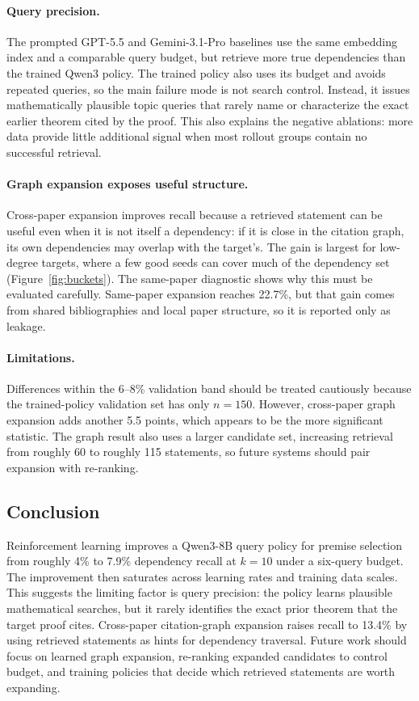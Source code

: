 \paragraph{Query precision.} The prompted GPT-5.5 and Gemini-3.1-Pro baselines use the same embedding index and a comparable query budget, but retrieve more true dependencies than the trained Qwen3 policy. The trained policy also uses its budget and avoids repeated queries, so the main failure mode is not search control. Instead, it issues mathematically plausible topic queries that rarely name or characterize the exact earlier theorem cited by the proof. This also explains the negative ablations: more data provide little additional signal when most rollout groups contain no successful retrieval.

\paragraph{Graph expansion exposes useful structure.} Cross-paper expansion improves recall because a retrieved statement can be useful even when it is not itself a dependency: if it is close in the citation graph, its own dependencies may overlap with the target's. The gain is largest for low-degree targets, where a few good seeds can cover much of the dependency set (Figure~\ref{fig:buckets}). The same-paper diagnostic shows why this must be evaluated carefully. Same-paper expansion reaches 22.7\%, but that gain comes from shared bibliographies and local paper structure, so it is reported only as leakage.

\paragraph{Limitations.} Differences within the 6--8\% validation band should be treated cautiously because the trained-policy validation set has only $n{=}150$. However, cross-paper graph expansion adds another 5.5 points, which appears to be the more significant statistic. The graph result also uses a larger candidate set, increasing retrieval from roughly 60 to roughly 115 statements, so future systems should pair expansion with re-ranking.

\subsection{Conclusion}
Reinforcement learning improves a Qwen3-8B query policy for premise selection from roughly 4\% to 7.9\% dependency recall at $k{=}10$ under a six-query budget. The improvement then saturates across learning rates and training data scales. This suggests the limiting factor is query precision: the policy learns plausible mathematical searches, but it rarely identifies the exact prior theorem that the target proof cites. Cross-paper citation-graph expansion raises recall to 13.4\% by using retrieved statements as hints for dependency traversal. Future work should focus on learned graph expansion, re-ranking expanded candidates to control budget, and training policies that decide which retrieved statements are worth expanding.